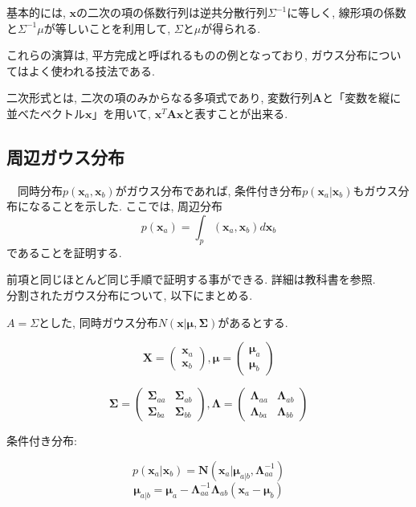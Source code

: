 基本的には, $\bm{x}$の二次の項の係数行列は逆共分散行列$\Sigma^{-1}$に等しく, 線形項の係数と$\Sigma^{-1}\mu$が等しいことを利用して, $\Sigma$と$\mu$が得られる. 

これらの演算は, 平方完成と呼ばれるものの例となっており, ガウス分布についてはよく使われる技法である.

 二次形式とは, 二次の項のみからなる多項式であり, 変数行列$\bm{A}$と「変数を縦に並べたベクトル$\bm{x}$」を用いて, $\bm{x}^{T}\bm{A}\bm{x}$と表すことが出来る.

\subsection{周辺ガウス分布}
　同時分布$p(\bm{x}_{a}, \bm{x}_{b})$がガウス分布であれば, 条件付き分布$p(\bm{x}_{a}|\bm{x}_{b})$もガウス分布になることを示した. ここでは, 周辺分布
$$ p(\bm{x}_{a}) = \int_p(\bm{x}_{a}, \bm{x}_{b})d\bm{x}_{b} $$ 
であることを証明する.

前項と同じほとんど同じ手順で証明する事ができる. 詳細は教科書を参照.
\\

分割されたガウス分布について, 以下にまとめる.

$A = \Sigma$とした, 同時ガウス分布$ N(\bm{x}|\bm{\mu}, \bm{\Sigma}) $があるとする.

$$ \bm{X} = \left(\begin{array}{c}\bm{x}_{a}\\ \bm{x}_{b}\end{array}\right), \bm{\mu} = \left(\begin{array}{c}\bm{\mu}_{a}\\ \bm{\mu}_{b}\end{array}\right)$$

$$ \bm{\Sigma} = \left(\begin{array}{cc}\bm{\Sigma}_{aa} & \bm{\Sigma}_{ab}\\ \bm{\Sigma}_{ba} & \bm{\Sigma}_{bb}\end{array}\right), \bm{\Lambda} =  \left(\begin{array}{cc}\bm{\Lambda}_{aa} & \bm{\Lambda}_{ab}\\ \bm{\Lambda}_{ba} & \bm{\Lambda}_{bb}\end{array}\right)$$

条件付き分布:

$$ p(\bm{x}_{a}|\bm{x}_{b}) = \bm{N}(\bm{x}_{a}|\bm{\mu}_{a|b}, \bm{\Lambda}_{aa}^{-1})  $$
$$ \bm{\mu}_{a|b} = \bm{\mu}_{a} - \bm{\Lambda}_{aa}^{-1} \bm{\Lambda}_{ab}(\bm{x}_{a} - \bm{\mu}_{b}) $$

